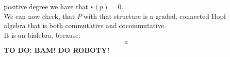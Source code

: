 \documentclass[a4paper, 12pt]{report}
\newcommand{\todo}[1]{\hfill \break \textbf{\Huge TO DO: #1 \hfill \break}\normalsize}
\begin{document}
positive degree we have that $\varepsilon(p) = 0$. \\
We can now check, that $P$ with that structure is a graded, connected Hopf algebra that is both commutative 
and cocommutative. \\
It is an bialebra, because: 
\begin{align*}
a
\end{align*}
\todo{BAM! DO ROBOTY!}
\end{document}
